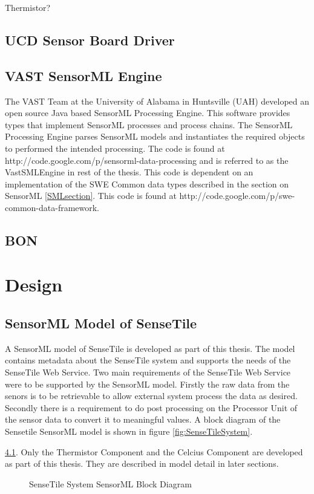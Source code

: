 \documentclass[]{final_report}
\begin{document}
Thermistor?

\section{UCD Sensor Board Driver}


\section{VAST SensorML Engine}
The VAST Team at the University of Alabama in Huntsville (UAH)  developed an open source Java based SensorML Processing Engine. This software provides types that implement SensorML processes and process  chains. The SensorML Processing Engine parses SensorML models and instantiates the required objects to performed the intended processing. The code is found at http://code.google.com/p/sensorml-data-processing and is referred to as the VastSMLEngine in rest of the thesis. This code is dependent on an implementation of the SWE Common data types described in the section on SensorML \ref{SMLsection}. This code is found at http://code.google.com/p/swe-common-data-framework.


\section{BON}


\chapter{Design}
\section{SensorML Model of SenseTile}

A SensorML model of SenseTile is developed as part of this thesis. The model contains metadata about the SenseTile system and supports the needs of the SenseTile Web Service. Two main requirements of the SenseTile Web Service were to be supported by the SensorML model. Firstly the raw data from the senors is to be retrievable to allow external system process the data as desired. Secondly there is a requirement to do post processing on the Processor Unit of the sensor data to convert it to meaningful values. A block diagram of the Sensetile SensorML model is shown in figure \ref{fig:SenseTileSystem}.

\ref{fig:SensorML_SenseTile_System_comp}. Only the Thermistor Component and the Celcius Component are developed as part of this thesis. They are described in model detail in later sections.
\begin{figure}[h]
\caption{SenseTile System SensorML Block Diagram}\label{fig:SensorML_SenseTile_System_comp}
\end{figure}
\end{document}
